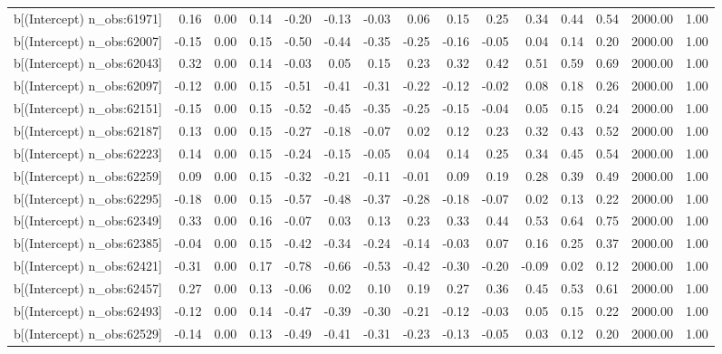 \begin{table}[ht]
\begin{tabular}{rrrrrrrrrrrrrrr}
  b[(Intercept) n\_obs:61971] & 0.16 & 0.00 & 0.14 & -0.20 & -0.13 & -0.03 & 0.06 & 0.15 & 0.25 & 0.34 & 0.44 & 0.54 & 2000.00 & 1.00 \\ 
  b[(Intercept) n\_obs:62007] & -0.15 & 0.00 & 0.15 & -0.50 & -0.44 & -0.35 & -0.25 & -0.16 & -0.05 & 0.04 & 0.14 & 0.20 & 2000.00 & 1.00 \\ 
  b[(Intercept) n\_obs:62043] & 0.32 & 0.00 & 0.14 & -0.03 & 0.05 & 0.15 & 0.23 & 0.32 & 0.42 & 0.51 & 0.59 & 0.69 & 2000.00 & 1.00 \\ 
  b[(Intercept) n\_obs:62097] & -0.12 & 0.00 & 0.15 & -0.51 & -0.41 & -0.31 & -0.22 & -0.12 & -0.02 & 0.08 & 0.18 & 0.26 & 2000.00 & 1.00 \\ 
  b[(Intercept) n\_obs:62151] & -0.15 & 0.00 & 0.15 & -0.52 & -0.45 & -0.35 & -0.25 & -0.15 & -0.04 & 0.05 & 0.15 & 0.24 & 2000.00 & 1.00 \\ 
  b[(Intercept) n\_obs:62187] & 0.13 & 0.00 & 0.15 & -0.27 & -0.18 & -0.07 & 0.02 & 0.12 & 0.23 & 0.32 & 0.43 & 0.52 & 2000.00 & 1.00 \\ 
  b[(Intercept) n\_obs:62223] & 0.14 & 0.00 & 0.15 & -0.24 & -0.15 & -0.05 & 0.04 & 0.14 & 0.25 & 0.34 & 0.45 & 0.54 & 2000.00 & 1.00 \\ 
  b[(Intercept) n\_obs:62259] & 0.09 & 0.00 & 0.15 & -0.32 & -0.21 & -0.11 & -0.01 & 0.09 & 0.19 & 0.28 & 0.39 & 0.49 & 2000.00 & 1.00 \\ 
  b[(Intercept) n\_obs:62295] & -0.18 & 0.00 & 0.15 & -0.57 & -0.48 & -0.37 & -0.28 & -0.18 & -0.07 & 0.02 & 0.13 & 0.22 & 2000.00 & 1.00 \\ 
  b[(Intercept) n\_obs:62349] & 0.33 & 0.00 & 0.16 & -0.07 & 0.03 & 0.13 & 0.23 & 0.33 & 0.44 & 0.53 & 0.64 & 0.75 & 2000.00 & 1.00 \\ 
  b[(Intercept) n\_obs:62385] & -0.04 & 0.00 & 0.15 & -0.42 & -0.34 & -0.24 & -0.14 & -0.03 & 0.07 & 0.16 & 0.25 & 0.37 & 2000.00 & 1.00 \\ 
  b[(Intercept) n\_obs:62421] & -0.31 & 0.00 & 0.17 & -0.78 & -0.66 & -0.53 & -0.42 & -0.30 & -0.20 & -0.09 & 0.02 & 0.12 & 2000.00 & 1.00 \\ 
  b[(Intercept) n\_obs:62457] & 0.27 & 0.00 & 0.13 & -0.06 & 0.02 & 0.10 & 0.19 & 0.27 & 0.36 & 0.45 & 0.53 & 0.61 & 2000.00 & 1.00 \\ 
  b[(Intercept) n\_obs:62493] & -0.12 & 0.00 & 0.14 & -0.47 & -0.39 & -0.30 & -0.21 & -0.12 & -0.03 & 0.05 & 0.15 & 0.22 & 2000.00 & 1.00 \\ 
  b[(Intercept) n\_obs:62529] & -0.14 & 0.00 & 0.13 & -0.49 & -0.41 & -0.31 & -0.23 & -0.13 & -0.05 & 0.03 & 0.12 & 0.20 & 2000.00 & 1.00 \\ 

\end{tabular}
\end{table}
